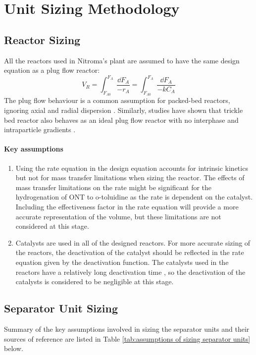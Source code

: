 \section{Unit Sizing Methodology}
\label{app:sizing}
\subsection{Reactor Sizing}

All the reactors used in Nitroma's plant are assumed to have the same design equation as a plug flow reactor:
\begin{equation}
    V_R = \int_{F_{A0}}^{F_{A}} \frac{\dd F_A}{-r_A} = \int_{F_{A0}}^{F_{A}} \frac{\dd F_A}{-kC_A}
    \label{reactor_sizing}
\end{equation}
The plug flow behaviour is a common assumption for packed-bed reactors, ignoring axial and radial dispersion \cite{froment_chemical_nodate}. Similarly, studies have shown that  trickle bed reactor also behaves as an ideal plug flow reactor with no interphase and intraparticle gradients \cite{p_a_ramachandran_recent_1987}.

\paragraph{Key assumptions}
\begin{enumerate}
    \item Using the rate equation in the design equation accounts for intrinsic kinetics but not for mass transfer limitations when sizing the reactor. The effects of mass transfer limitations on the rate might be significant for the hydrogenation of ONT to o-toluidine as the rate is dependent on the catalyst. Including the effectiveness factor in the rate equation will provide a more accurate representation of the volume, but these limitations are not considered at this stage.
    \item Catalysts are used in all of the designed reactors. For more accurate sizing of the reactors, the deactivation of the catalyst should be reflected in the rate equation given by the deactivation function. The catalysts used in the reactors have a relatively long deactivation time \cite{temizel_novel_2020}, so the deactivation of the catalysts is considered to be negligible at this stage.
\end{enumerate}


\subsection{Separator Unit Sizing}
Summary of the key assumptions involved in sizing the separator units and their sources of reference are listed in Table \ref{tab:assumptions of sizing separator units} below. 

